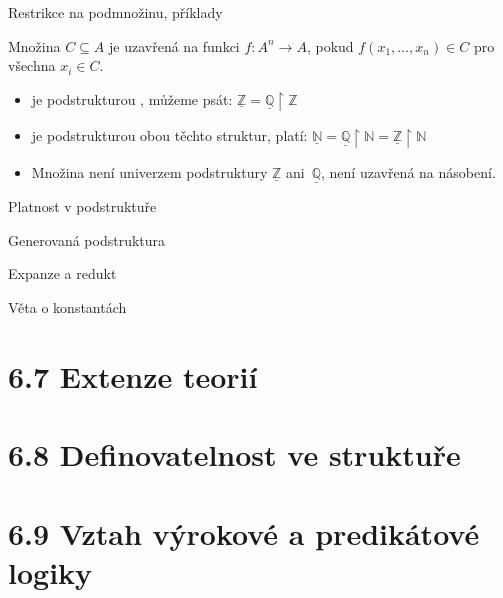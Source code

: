 \documentclass{beamer}
\begin{document}
\begin{frame}{Restrikce na podmnožinu, příklady}
    
    Množina $C\subseteq A$ je \alert{uzavřená} na funkci $f:A^n\to A$, pokud $f(x_1,\dots,x_n)\in C$ pro všechna $x_i\in C$.

    \medskip


    \medskip
    
    \begin{itemize}
        \item {} je podstrukturou , můžeme psát: \alert{$\underline{\mathbb Z}=\underline{\mathbb Q}\restriction\mathbb Z$}
        \item {} je podstrukturou obou těchto struktur, platí: \alert{$\underline{\mathbb N}=\underline{\mathbb Q}\restriction\mathbb N=\underline{\mathbb Z}\restriction\mathbb N$}
        \item Množina  není univerzem podstruktury $\underline{\mathbb Z}$ ani~$\underline{\mathbb Q}$, není uzavřená na násobení.
    \end{itemize}
\end{frame}


\begin{frame}{Platnost v podstruktuře}
    
    
\end{frame}


\begin{frame}{Generovaná podstruktura}
    
    
\end{frame}


\begin{frame}{Expanze a redukt}
    
\end{frame}


\begin{frame}{Věta o konstantách}


\end{frame}


\section{6.7 Extenze teorií}


\section{6.8 Definovatelnost ve struktuře}


\section{6.9 Vztah výrokové a predikátové logiky}
\end{document}
